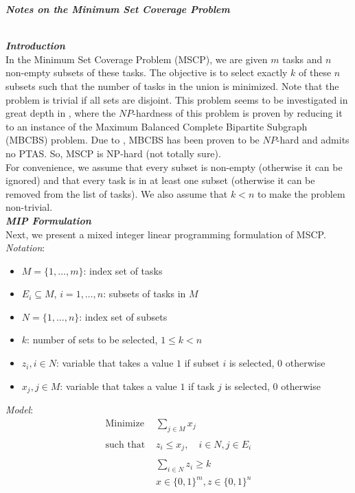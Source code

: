 \documentclass[12pt]{article}
\newcommand{\bin}{\{0,1\}}
\newcommand{\heading}[1]{\emph{\textbf{\large #1}}}
\newcommand{\subheading}[1]{\emph{\textbf{#1}}}
\begin{document}
\begin{center}
\heading{Notes on the Minimum Set Coverage Problem}\\ \quad \\
\end{center}

\subheading{Introduction}\\

In the Minimum Set Coverage Problem (MSCP), we are given $m$ tasks and $n$ non-empty subsets of these tasks. The objective is to select exactly $k$ of these $n$ subsets such that the number of tasks in the union is minimized. Note that the problem is trivial if all sets are disjoint. This problem seems to be investigated in great depth in \cite{Vinterbo2007}, where the $NP$-hardness of this problem is proven by reducing it to an instance of the Maximum Balanced Complete Bipartite Subgraph (MBCBS) problem. Due to \cite{SubhashKhot2006}, MBCBS has been proven to be $NP$-hard and admits no PTAS. So, MSCP is NP-hard (not totally sure).\\

For convenience, we assume that every subset is non-empty (otherwise it can be ignored) and that every task is in at least one subset (otherwise it can be removed from the list of tasks). We also assume that $k < n$ to make the problem non-trivial.\\

\subheading{MIP Formulation}\\

Next, we present a mixed integer linear programming formulation of MSCP.\\

\textit{Notation}:
\begin{itemize}
\item $M = \{1,\ldots,m\}$: index set of tasks
\item $E_i \subseteq M$, $i=1,\ldots,n$: subsets of tasks in $M$
\item $N = \{1,\ldots,n\}$: index set of subsets
\item $k$: number of sets to be selected, $1 \leq k < n$
\item $z_i,i \in N$: variable that takes a value $1$ if subset $i$ is selected, $0$ otherwise
\item $x_j,j \in M$: variable that takes a value $1$ if task $j$ is selected, $0$ otherwise
\end{itemize}

\textit{Model}:
\begin{align*}
\text{Minimize }  & \sum_{j \in M} x_j\\
                  & \\
\text{such that } & z_i \leq x_j, \quad i \in N,j \in E_i\\
                  & \\
                  & \sum_{i \in N} z_i \geq k\\
                  & x \in \bin^m,z \in \bin^n
\end{align*}
\end{document}

